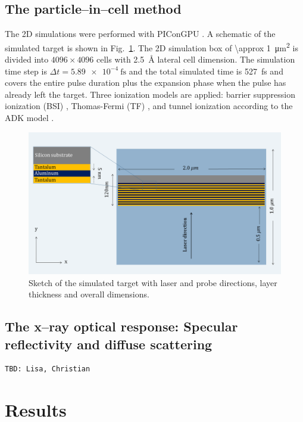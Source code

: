 \documentclass[preprint, 12pt]{elsarticle}
\begin{document}
\subsection{The particle--in--cell method\label{sec:PIC}}
The 2D simulations were performed with PIConGPU \cite{Bussmann2013}
. A
schematic of the simulated target is shown in Fig.~\ref{fig:simulation_setup}.
The 2D simulation box of \SI{\approx 1}{\square\micro\meter} is divided into $4096 \times 4096$ cells with
\SI{2.5}{\angstrom} lateral cell
dimension.  The simulation time step is ${\Delta}t=\SI{5.89e-4}{\fs}$
and the total simulated time is \SI{527}{\fs} and covers the entire pulse
duration plus the expansion phase when the pulse has already left the target.
Three ionization models are applied: barrier suppression ionization (BSI)
\cite{TBD}, Thomas-Fermi (TF) \cite{TBD}, and tunnel ionization according to the ADK model \cite{TBD}.
%
\begin{figure}[ht]
  \centering%
  \includegraphics[width=0.8\linewidth]{P_2.png}
  \caption{Sketch of the simulated target with laser and probe directions, layer
    thickness and overall dimensions.}
  \label{fig:simulation_setup}
\end{figure}
%
\subsection{The x--ray optical response: Specular reflectivity and diffuse scattering\label{sec:response}}
%
\begin{verbatim}
TBD: Lisa, Christian
\end{verbatim}
%
\lipsum[1]
%
\section{Results\label{sec:Results}}
\end{document}
